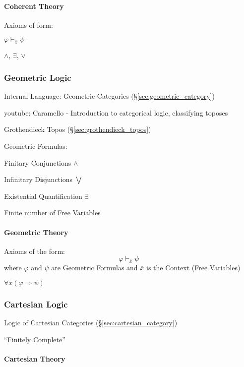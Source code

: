 \paragraph{Coherent Theory}\label{sec:coherent_theory}\hfill

Axioms of form:

$\varphi \vdash_{\overline{x}} \psi$

$\wedge$, $\exists$, $\vee$



\subsubsection{Geometric Logic}\label{sec:geometric_logic}

Internal Language: Geometric Categories
(\S\ref{sec:geometric_category})


youtube: Caramello - Introduction to categorical logic, classifying
toposes

Grothendieck Topos (\S\ref{sec:grothendieck_topos})

Geometric Formulas:

Finitary Conjunctions $\wedge$

Infinitary Disjunctions $\bigvee$

Existential Quantification $\exists$

Finite number of Free Variables



\paragraph{Geometric Theory}\label{sec:geometric_theory}\hfill

Axioms of the form:
\[
  \varphi \vdash_{\overline{x}} \psi
\]
where $\varphi$ and $\psi$ are Geometric Formulas and $\overline{x}$
is the Context (Free Variables) %

$\forall \overline{x} (\varphi \Rightarrow \psi)$



\subsubsection{Cartesian Logic}\label{sec:cartesian_logic}

Logic of Cartesian Categories (\S\ref{sec:cartesian_category})

``Finitely Complete''



\paragraph{Cartesian Theory}\label{sec:cartesian_theory}\hfill

